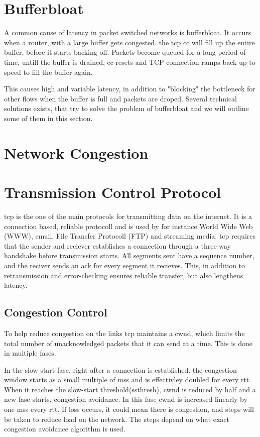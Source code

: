 \section{Bufferbloat}

A common cause of latency in packet switched networks is bufferbloat. It occurs when a router, with a large buffer gets congested. the tcp \gls{cc} will fill up the entire buffer, before it starts backing off. Packets become queued for a long period of time, untill the buffer is drained, \gls{cc} resets and TCP connection ramps back up to speed to fill the buffer again.

This causes high and variable latency, in addition to "blocking" the bottleneck for other flows when the buffer is full and packets are droped. Several technical solutions exists, that try to solve the problem of bufferbloat and we will outline some of them  in this section.

\section{Network Congestion}


\section{Transmission Control Protocol}

\gls{tcp} is the one of the main protocols for transmitting data on the internet. It is a connection based, reliable protocoll and is used by for instance World Wide Web (WWW), email, File Transfer Protocoll (FTP) and streaming media. \gls{tcp} requires that the sender and reciever establishes a connection through a three-way handshake before transmission starts. All segments sent have a sequence number, and the reciver sends an \gls{ack} for every segment it recieves. This, in addition to retransmission and error-checking ensures reliable transfer, but also lengthens latency.

\subsection{Congestion Control}

To help reduce congestion on the links \gls{tcp} maintains a \gls{cwnd}, which limits the total number of unacknowledged packets that it can send at a time. This is  done in multiple fases.

In the slow start fase,  right after a connection is established. the congestion window starts as a small multiple of \gls{mss} and is effectivley doubled for every \gls{rtt}. When it reaches the slow-start threshold(ssthresh), \gls{cwnd} is reduced by half and a new fase starts, congestion avoidance. In this fase \gls{cwnd} is increased linearly by one \gls{mss} every \gls{rtt}. If loss occurs, it could mean there is congestion, and steps will be taken to reduce load on the network. The steps depend on what exact congestion avoidance algorithm is used.

